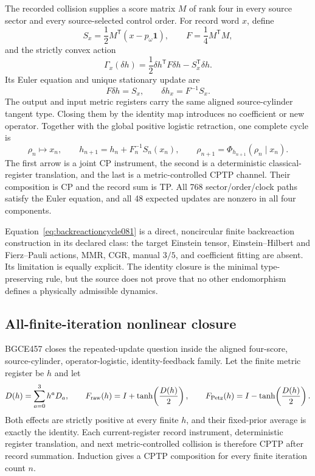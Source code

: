 \documentclass[11pt]{article}
\theoremstyle{definition}
\theoremstyle{remark}
\begin{document}
The recorded collision supplies a score matrix $M$ of rank four in every source sector and every source-selected control order. For record word $x$, define
\begin{equation}
 S_x=\frac12M^{\mathsf T}(x-p_\omega\mathbf 1),
 \qquad
 F=\frac14M^{\mathsf T}M,
\end{equation}
and the strictly convex action
\begin{equation}\label{eq:fisheraction081}
 \Gamma_x(\delta h)
 =\frac12\delta h^{\mathsf T}F\delta h-S_x^{\mathsf T}\delta h.
\end{equation}
Its Euler equation and unique stationary update are
\begin{equation}\label{eq:fisherupdate081}
 F\delta h=S_x,
 \qquad
 \delta h_x=F^{-1}S_x.
\end{equation}
The output and input metric registers carry the same aligned source-cylinder tangent type. Closing them by the identity map introduces no coefficient or new operator. Together with the global positive logistic retraction, one complete cycle is
\begin{equation}\label{eq:backreactioncycle081}
 \rho_n\longmapsto x_n,
 \qquad
 h_{n+1}=h_n+F_n^{-1}S_n(x_n),
 \qquad
 \rho_{n+1}=\Phi_{h_{n+1}}(\rho_n\mid x_n).
\end{equation}
The first arrow is a joint CP instrument, the second is a deterministic classical-register translation, and the last is a metric-controlled CPTP channel. Their composition is CP and the record sum is TP. All 768 sector/order/clock paths satisfy the Euler equation, and all 48 expected updates are nonzero in all four components.

Equation~\eqref{eq:backreactioncycle081} is a direct, noncircular finite backreaction construction in its declared class: the target Einstein tensor, Einstein--Hilbert and Fierz--Pauli actions, MMR, CGR, manual $3/5$, and coefficient fitting are absent. Its limitation is equally explicit. The identity closure is the minimal type-preserving rule, but the source does not prove that no other endomorphism defines a physically admissible dynamics.

\subsection{All-finite-iteration nonlinear closure}

BGCE457 closes the repeated-update question inside the aligned four-score, source-cylinder, operator-logistic, identity-feedback family. Let the finite metric register be $h$ and let
\begin{equation}
 D(h)=\sum_{a=0}^{3}h^aD_a,
 \qquad
 F_{\rm raw}(h)=I+\tanh\!\left(\frac{D(h)}2\right),
 \qquad
 F_{\rm Petz}(h)=I-\tanh\!\left(\frac{D(h)}2\right).
\end{equation}
Both effects are strictly positive at every finite $h$, and their fixed-prior average is exactly the identity. Each current-register record instrument, deterministic register translation, and next metric-controlled collision is therefore CPTP after record summation. Induction gives a CPTP composition for every finite iteration count $n$.
\end{document}
